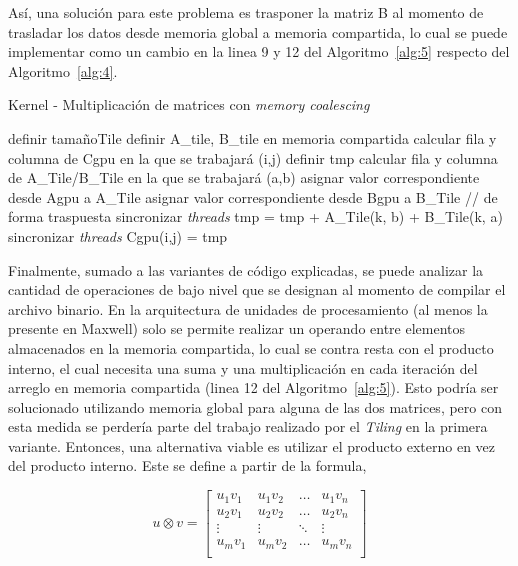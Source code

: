 Así, una solución para este problema es trasponer la matriz B al momento de trasladar los datos desde memoria global a memoria compartida, lo cual se puede implementar como un cambio en la linea 9 y 12 del Algoritmo~\ref{alg:5} respecto del Algoritmo~\ref{alg:4}. 

\begin{algorithm}
\caption{Kernel - Multiplicación de matrices con \textit{memory coalescing}}
\label{alg:5}
\begin{algorithmic}[1]
\State definir tamañoTile
\State definir A\_tile, B\_tile en memoria compartida
\State calcular fila y columna de Cgpu en la que se trabajará (i,j)
\State definir tmp
    \State calcular fila y columna de A\_Tile/B\_Tile en la que se trabajará (a,b)
    \State asignar valor correspondiente desde Agpu a A\_Tile 
    \State asignar valor correspondiente desde Bgpu a B\_Tile // de forma traspuesta 
    \State sincronizar \textit{threads}
        \State tmp = tmp + A\_Tile(k, b) + B\_Tile(k, a)
    \EndFor
    \State sincronizar \textit{threads}
\EndFor
\State Cgpu(i,j) = tmp
\EndProcedure
\end{algorithmic}
\end{algorithm}

Finalmente, sumado a las variantes de código explicadas, se puede analizar la cantidad de operaciones de bajo nivel que se designan al momento de compilar el archivo binario. 
En la arquitectura de unidades de procesamiento (al menos la presente en Maxwell) solo se permite realizar un operando entre elementos almacenados en la memoria compartida, lo cual se contra resta con el producto interno, el cual necesita una suma y una multiplicación en cada iteración del arreglo en memoria compartida (linea 12 del Algoritmo~\ref{alg:5}).
Esto podría ser solucionado utilizando memoria global para alguna de las dos matrices, pero con esta medida se perdería parte del trabajo realizado por el \textit{Tiling} en la primera variante.
Entonces, una alternativa viable es utilizar el producto externo en vez del producto interno.
Este se define a partir de la formula,

\begin{equation*}
u \otimes v = 
\begin{bmatrix} 
	u_1v_1 & u_1v_2 & \dots & u_1v_n\\
	u_2v_1 & u_2v_2 & \dots & u_2v_n\\
	\vdots & \vdots & \ddots & \vdots \\
	u_mv_1 & u_mv_2 & \dots & u_mv_n\\
	\end{bmatrix}
\end{equation*}



